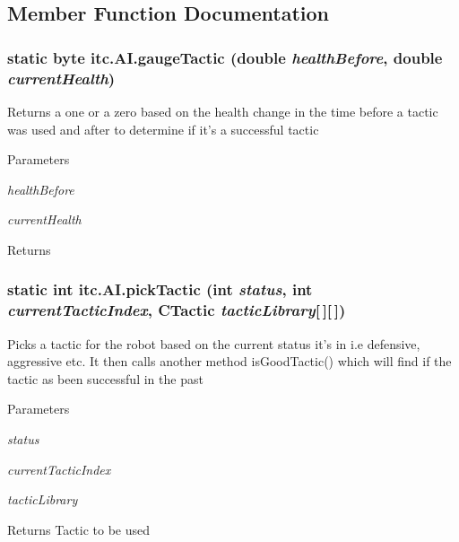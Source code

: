 \subsection{Member Function Documentation}
\hypertarget{classitc_1_1_a_i_a8cf895fa4d48d6f2c6f17bd49d46ffaa}{
\subsubsection[{gaugeTactic}]{\setlength{\rightskip}{0pt plus 5cm}static byte itc.AI.gaugeTactic (double {\em healthBefore}, \/  double {\em currentHealth})}}
\label{classitc_1_1_a_i_a8cf895fa4d48d6f2c6f17bd49d46ffaa}
Returns a one or a zero based on the health change in the time before a tactic was used and after to determine if it's a successful tactic 
\begin{DoxyParams}{Parameters}
\item[{\em healthBefore}]\item[{\em currentHealth}]\end{DoxyParams}
\begin{DoxyReturn}{Returns}

\end{DoxyReturn}
\hypertarget{classitc_1_1_a_i_ad9fb9145c1561f60c2011ad877ea8a0a}{
\subsubsection[{pickTactic}]{\setlength{\rightskip}{0pt plus 5cm}static int itc.AI.pickTactic (int {\em status}, \/  int {\em currentTacticIndex}, \/  {\bf CTactic} {\em tacticLibrary}\mbox{[}$\,$\mbox{]}\mbox{[}$\,$\mbox{]})}}
\label{classitc_1_1_a_i_ad9fb9145c1561f60c2011ad877ea8a0a}
Picks a tactic for the robot based on the current status it's in i.e defensive, aggressive etc. It then calls another method isGoodTactic() which will find if the tactic as been successful in the past 
\begin{DoxyParams}{Parameters}
\item[{\em status}]\item[{\em currentTacticIndex}]\item[{\em tacticLibrary}]\end{DoxyParams}
\begin{DoxyReturn}{Returns}
Tactic to be used 
\end{DoxyReturn}


